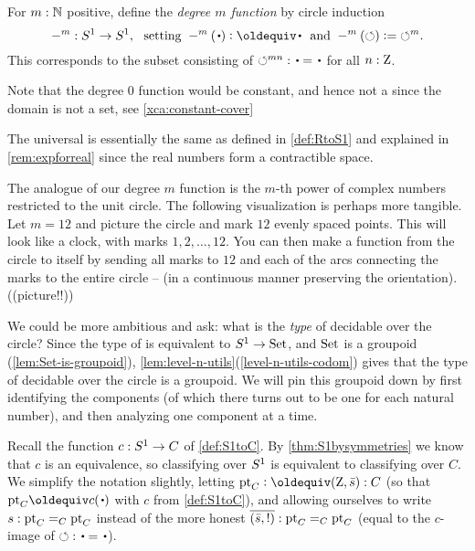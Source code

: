 \begin{example}\label{exa:mfoldS1cover}
For $m:\mathbb{N}$ positive, define the \emph{degree $m$ function} by circle induction
\[
-^m:\Sc\to \Sc, \text{~~setting~} 
-^m(\base)\defeq\base \text{~~and~} 
-^m(\Sloop)\defis{\Sloop}^m.
\]
This \covering corresponds to the subset consisting 
of ${\Sloop}^{mn} : \base=\base$ for all $n:\mathrm{Z}$.
\end{example}

Note that the degree $0$ function would be constant,
and hence not a \covering since the domain is not a set,
see \cref{xca:constant-cover}

\begin{remark}
  \label{rem:RtoS1}
The universal \covering is essentially the same as defined in \cref{def:RtoS1}
and explained in \cref{rem:expforreal}
since the real numbers form a contractible space.

\label{rem:finitecoveringsofS1}
The analogue of our degree $m$ function is the $m$-th power of complex numbers 
restricted to the unit circle. %
The following visualization is perhaps more tangible.  
Let $m=12$ and picture the circle and mark $12$ evenly spaced points.
This will look like a clock, with marks $1,2,\dots,12$. 
You can then make a function from the circle to itself by sending 
all marks to $12$ and each of the arcs connecting the marks to the entire circle 
-- (in a continuous manner preserving the orientation).
  ((picture!!))
\end{remark}

We could be more ambitious and ask: what is the \emph{type} of decidable 
\coverings over the circle?  Since the type of \coverings is 
equivalent to ${S^1}\to \mathord{\mathrm{Set}}$, and $\mathord{\mathrm{Set}}$ is a groupoid
(\cref{lem:Set-is-groupoid}),
\cref{lem:level-n-utils}(\ref{level-n-utils-codom}) gives
that the type of decidable \coverings over the circle is a groupoid.  
We will pin this groupoid down by first identifying the components 
(of which there turns out to be one for each natural number), 
and then analyzing one component at a time.

Recall the function $c:{S^1}\to C$ of \cref{def:S1toC}. 
By \cref{thm:S1bysymmetries} we know that $c$ is an equivalence, 
so classifying \coverings over ${S^1}$ is equivalent to 
classifying \coverings over $C$.  
We simplify the notation slightly, letting $\pt_C\defeq(\zet,\etop{s}):C$ 
(so that $\pt_C \jdeq c(\base)$ with $c$ from \cref{def:S1toC}), 
and allowing ourselves to write $s:{\mathord{\mathrm{pt}}}_C=_C{\mathord{\mathrm{pt}}}_C$ instead of the 
more honest $\overline{({\bar {s}},{!})}:{\mathord{\mathrm{pt}}}_C=_C{\mathord{\mathrm{pt}}}_C$ 
(equal to the $c$-image of ${\Sloop}:\base=\base$).

